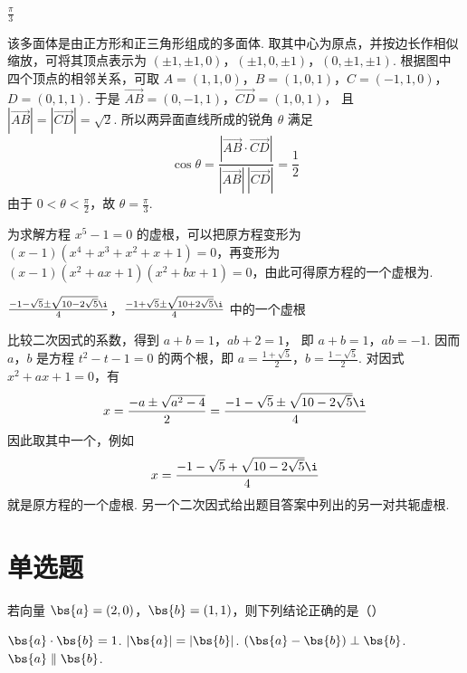 \begin{answer}
\(\frac{\pi}{3}\)
\end{answer}

\begin{solution}
该多面体是由正方形和正三角形组成的多面体. 取其中心为原点，并按边长作相似缩放，可将其顶点表示为
\((\pm1,\pm1,0)\)，\((\pm1,0,\pm1)\)，\((0,\pm1,\pm1)\).
根据图中四个顶点的相邻关系，可取
\(A=(1,1,0)\)，\(B=(1,0,1)\)，\(C=(-1,1,0)\)，\(D=(0,1,1)\).
于是
\(\overrightarrow{AB}=(0,-1,1)\)，\(\overrightarrow{CD}=(1,0,1)\)，
且 \(|\overrightarrow{AB}|=|\overrightarrow{CD}|=\sqrt{2}\). 所以两异面直线所成的锐角 \(\theta\) 满足
\[
\cos\theta=\frac{|\overrightarrow{AB}\cdot\overrightarrow{CD}|}{|\overrightarrow{AB}|\,|\overrightarrow{CD}|}
 =\frac{1}{2}
\]
由于 \(0<\theta<\frac{\pi}{2}\)，故 \(\theta=\frac{\pi}{3}\).
\end{solution}

\begin{problem}
为求解方程 \(x^{5} - 1 = 0\) 的虚根，可以把原方程变形为 \((x - 1)(x^4 + x^3 + x^2 + x + 1) = 0\)，再变形为 \((x - 1)(x^2 + ax + 1)(x^2 + bx + 1) = 0\)，由此可得原方程的一个虚根为\fillinblank{}.
\end{problem}

\begin{answer}
\(\frac{-1-\sqrt{5}\pm\sqrt{10-2\sqrt{5}}\i}{4}\)，\(\frac{-1+\sqrt{5}\pm\sqrt{10+2\sqrt{5}}\i}{4}\) 中的一个虚根
\end{answer}

\begin{solution}
比较二次因式的系数，得到
\(a+b=1\)，\(ab+2=1\)，
即 \(a+b=1\)，\(ab=-1\). 因而 \(a\)，\(b\) 是方程 \(t^2-t-1=0\) 的两个根，即
\(a=\frac{1+\sqrt{5}}{2}\)，\(b=\frac{1-\sqrt{5}}{2}\).
对因式 \(x^2+ax+1=0\)，有
\[
x=\frac{-a\pm\sqrt{a^2-4}}{2}
 =\frac{-1-\sqrt{5}\pm\sqrt{10-2\sqrt{5}}\i}{4}
\]
因此取其中一个，例如
\[
x=\frac{-1-\sqrt{5}+\sqrt{10-2\sqrt{5}}\i}{4}
\]
就是原方程的一个虚根. 另一个二次因式给出题目答案中列出的另一对共轭虚根.
\end{solution}

\section{单选题}

\begin{problem}
若向量 \(\bs{a} = (2,0)\)，\(\bs{b} = (1,1)\)，则下列结论正确的是（\quad）

\choices
    {\(\bs{a} \cdot \bs{b} = 1\).}
    {\(|\bs{a}| = |\bs{b}|\).}
    {\((\bs{a} - \bs{b})\perp \bs{b}\).}
    {\(\bs{a} \parallel \bs{b}\).}
\end{problem}

